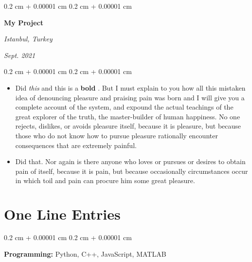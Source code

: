 \documentclass[10pt, letterpaper]{article}
\newenvironment{highlights}{
    \begin{itemize}[
        topsep=0.10 cm,
        parsep=0.10 cm,
        partopsep=0pt,
        itemsep=0pt,
        leftmargin=0.4 cm + 10pt + 0.6 cm
    ]
}{
    \end{itemize}
} %
\newenvironment{onecolentry}{
    \begin{adjustwidth}{
        0.2 cm + 0.00001 cm
    }{
        0.2 cm + 0.00001 cm
    }
}{
    \end{adjustwidth}
} %
\newenvironment{threecolentry}[3][]{
    \onecolentry
    \def\thirdColumn{#3}
    \setcolumnwidth{0.6 cm, \fill, 4.5 cm}
    \begin{paracol}{3}
    #2 \switchcolumn
}{
    \switchcolumn \raggedleft \thirdColumn
    \end{paracol}
    \endonecolentry
} %
\let\hrefWithoutArrow\href
\renewcommand{\href}[2]{\hrefWithoutArrow{#1}{\mbox{\ifthenelse{\equal{#2}{}}{ }{#2 }\raisebox{.15ex}{\footnotesize \faExternalLink*}}}}
\begin{document}
        \vspace{0.2 cm-3px}

        \begin{threecolentry}{
            \vspace*{\fill}
            \textbullet
            \vspace*{3px}
            \vspace*{\fill}
        }{
        \textit{Istanbul, Turkey}    
            
        \textit{Sept. 2021}}
            \textbf{My Project}
        \end{threecolentry}

        \vspace{0.10 cm-3px}
        \begin{onecolentry}
            \begin{highlights}
                \item Did \textit{this} and this is a \textbf{bold} \href{https://example.com}{link}. But I must explain to you how all this mistaken idea of denouncing pleasure and praising pain was born and I will give you a complete account of the system, and expound the actual teachings of the great explorer of the truth, the master-builder of human happiness. No one rejects, dislikes, or avoids pleasure itself, because it is pleasure, but because those who do not know how to pursue pleasure rationally encounter consequences that are extremely painful.
                \item Did that. Nor again is there anyone who loves or pursues or desires to obtain pain of itself, because it is pain, but because occasionally circumstances occur in which toil and pain can procure him some great pleasure.
            \end{highlights}
        \end{onecolentry}



    
    \section{One Line Entries}

        
        \begin{onecolentry}
            \textbf{Pro\textnormal{gram}ming:} Python, C++, JavaScript, MATLAB
        \end{onecolentry}


    
\end{document}
